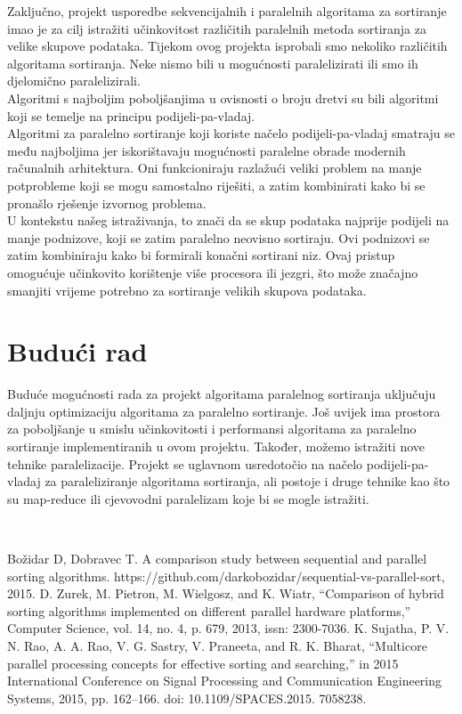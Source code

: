 \documentclass[conference]{IEEEtran}
\begin{document}
Zaključno, projekt usporedbe sekvencijalnih i paralelnih algoritama za sortiranje imao je za cilj istražiti učinkovitost različitih paralelnih metoda sortiranja za velike skupove podataka.
Tijekom ovog projekta isprobali smo nekoliko različitih algoritama sortiranja. Neke nismo bili u mogućnosti paralelizirati ili smo ih djelomično paralelizirali.\\
Algoritmi s najboljim poboljšanjima u ovisnosti o broju dretvi su bili algoritmi koji se temelje na principu podijeli-pa-vladaj. \\Algoritmi za paralelno sortiranje koji koriste načelo podijeli-pa-vladaj smatraju se među najboljima jer iskorištavaju mogućnosti paralelne obrade modernih računalnih arhitektura. Oni funkcioniraju razlažući veliki problem na manje potprobleme koji se mogu samostalno riješiti, a zatim kombinirati kako bi se pronašlo rješenje izvornog problema.\\ U kontekstu našeg istraživanja, to znači da se skup podataka najprije podijeli na manje podnizove, koji se zatim paralelno neovisno sortiraju. Ovi podnizovi se zatim kombiniraju kako bi formirali konačni sortirani niz. Ovaj pristup omogućuje učinkovito korištenje više procesora ili jezgri, što može značajno smanjiti vrijeme potrebno za sortiranje velikih skupova podataka. 


\section*{Budući rad}
Buduće mogućnosti rada za projekt algoritama paralelnog sortiranja uključuju daljnju optimizaciju algoritama za paralelno sortiranje. Još uvijek ima prostora za poboljšanje u smislu učinkovitosti i performansi algoritama za paralelno sortiranje implementiranih u ovom projektu.
Također, možemo istražiti nove tehnike paralelizacije. Projekt se uglavnom usredotočio na načelo podijeli-pa-vladaj za paraleliziranje algoritama sortiranja, ali postoje i druge tehnike kao što su map-reduce ili cjevovodni paralelizam koje bi se mogle istražiti.

\\
\begin{thebibliography}{00}
 Božidar D, Dobravec T. A comparison study between sequential and parallel sorting algorithms. https://github.com/darkobozidar/sequential-vs-parallel-sort, 2015.  
 D. Zurek, M. Pietron, M. Wielgosz, and K. Wiatr, “Comparison of hybrid sorting algorithms implemented on different parallel hardware platforms,” Computer Science, vol. 14, no. 4, p. 679, 2013, issn: 2300-7036.
 K. Sujatha, P. V. N. Rao, A. A. Rao, V. G. Sastry, V. Praneeta, and R. K.
Bharat, “Multicore parallel processing concepts for effective sorting and searching,” in 2015 International Conference on Signal Processing and Communication Engineering Systems, 2015, pp. 162–166. doi: 10.1109/SPACES.2015.
7058238.
\end{thebibliography}
\end{document}
